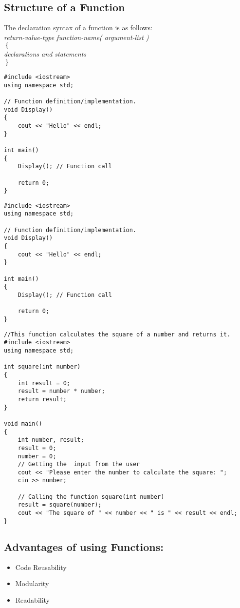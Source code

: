 \documentclass[12pt,a4paper]{article}
\begin{document}
\subsection{Structure of a Function}
The declaration syntax of a function is as follows:\\[0.3cm]
\textit{return-value-type    function-name( argument-list )\\
$\left\lbrace\right.$\\
\hspace{1cm}declarations and statements\\
$\left.\right\rbrace$}
\begin{lstlisting}
#include <iostream>
using namespace std;

// Function definition/implementation.
void Display()
{
	cout << "Hello" << endl;
}

int main()
{
	Display(); // Function call	
	
	return 0;
}
\end{lstlisting}
\begin{lstlisting}
#include <iostream>
using namespace std;

// Function definition/implementation.
void Display()
{
	cout << "Hello" << endl;
}

int main()
{
	Display(); // Function call	
	
	return 0;
}
\end{lstlisting}
\begin{lstlisting}
//This function calculates the square of a number and returns it.
#include <iostream>
using namespace std;

int square(int number)
{
    int result = 0;
    result = number * number;
    return result;
}

void main()
{
    int number, result;
    result = 0;
    number = 0;
    // Getting the  input from the user
    cout << "Please enter the number to calculate the square: ";
    cin >> number;

    // Calling the function square(int number)
    result = square(number);
    cout << "The square of " << number << " is " << result << endl;
}
\end{lstlisting}
\subsection{Advantages of using Functions:}
\begin{itemize}
\item Code Reusability
\item Modularity
\item Readability
\end{itemize}
\end{document}
